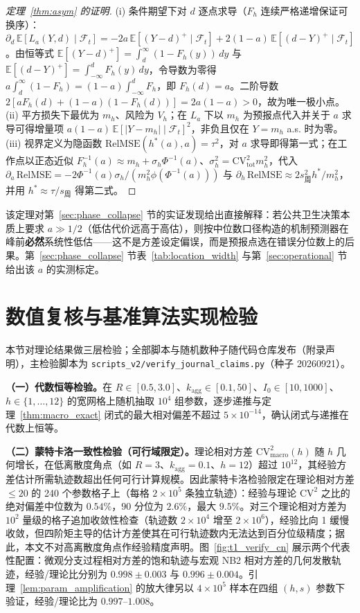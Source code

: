 \documentclass[10pt,UTF8,a4paper,zihao=-4]{ctexart}
\theoremstyle{plain}
\theoremstyle{definition}
\theoremstyle{remark}
\begin{document}
\begin{proof}[定理~\ref{thm:asym} 的证明]
(i) 条件期望下对 $d$ 逐点求导（$F_h$ 连续严格递增保证可换序）：$\partial_d\,\mathbb{E}[L_a(Y,d)\mid\mathcal{F}_t] = -2a\,\mathbb{E}[(Y-d)^+\mid\mathcal{F}_t] + 2(1-a)\,\mathbb{E}[(d-Y)^+\mid\mathcal{F}_t]$。由恒等式 $\mathbb{E}[(Y-d)^+] = \int_d^\infty (1-F_h(y))\,dy$ 与 $\mathbb{E}[(d-Y)^+] = \int_{-\infty}^d F_h(y)\,dy$，令导数为零得 $a\int_d^\infty (1-F_h) = (1-a)\int_{-\infty}^d F_h$，即 $F_h(d) = a$。二阶导数 $2[aF_h(d) + (1-a)(1-F_h(d))] = 2a(1-a) > 0$，故为唯一极小点。
(ii) 平方损失下最优为 $m_h$、风险为 $V_h$；在 $L_a$ 下以 $m_h$ 为预报点代入并关于 $a$ 求导可得增量项 $a(1-a)\,\mathbb{E}[|Y-m_h|\mid\mathcal{F}_t]^2$，非负且仅在 $Y=m_h$ a.s. 时为零。
(iii) 视界定义为隐函数 $\text{RelMSE}(h^*(a),a)=\tau^2$，对 $a$ 求导即得第一式；在工作点以正态近似 $F_h^{-1}(a) \approx m_h + \sigma_h\Phi^{-1}(a)$、$\sigma_h^2 = \text{CV}^2_{\text{tot}} m_h^2$，代入 $\partial_a\,\text{RelMSE} = -2\Phi^{-1}(a)\sigma_h/(m_h^2\phi(\Phi^{-1}(a)))$ 与 $\partial_h\,\text{RelMSE} \approx 2 s_{\text{周}}^2 h^*/m_h^2$，并用 $h^*\approx\tau/s_{\text{周}}$ 得第二式。
\end{proof}

该定理对第~\ref{sec:phase_collapse} 节的实证发现给出直接解释：若公共卫生决策本质上要求 $a \gg 1/2$（低估代价远高于高估），则按中位数口径构造的机制预测器在峰前\textbf{必然}系统性低估——这不是方差设定偏误，而是预报点选在错误分位数上的后果。第~\ref{sec:phase_collapse} 节表~\ref{tab:location_width} 与第~\ref{sec:operational} 节给出该 $a$ 的实测标定。


\section{数值复核与基准算法实现检验}\label{sec:simulation}

本节对理论结果做三层检验；全部脚本与随机数种子随代码仓库发布（附录声明），主检验脚本为 \texttt{scripts\_v2/verify\_journal\_claims.py}（种子 20260921）。

\textbf{（一）代数恒等检验。}在 $R \in [0.5, 3.0]$、$k_{\text{agg}} \in [0.1, 50]$、$I_0 \in [10, 1000]$、$h \in \{1,\dots,12\}$ 的宽网格上随机抽取 $10^4$ 组参数，逐步递推与定理~\ref{thm:macro_exact} 闭式的最大相对偏差不超过 $5 \times 10^{-14}$，确认闭式与递推在代数上恒等。

\textbf{（二）蒙特卡洛一致性检验（可行域限定）。}理论相对方差 $\text{CV}^2_{\text{macro}}(h)$ 随 $h$ 几何增长，在低离散度角点（如 $R=3$、$k_{\text{agg}}=0.1$、$h=12$）超过 $10^{12}$，其经验方差估计所需轨迹数超出任何可行计算规模。因此蒙特卡洛检验限定在理论相对方差 $\le 20$ 的 240 个参数格子上（每格 $2 \times 10^5$ 条独立轨迹）：经验与理论 $\text{CV}^2$ 之比的绝对偏差中位数为 $0.54\%$，$90$ 分位为 $2.6\%$，最大 $9.5\%$。对三个理论相对方差为 $10^2$ 量级的格子追加收敛性检查（轨迹数 $2 \times 10^4$ 增至 $2 \times 10^6$），经验比向 1 缓慢收敛，但四阶矩主导的估计方差使其在可行轨迹数内无法达到百分位级精度；据此，本文不对高离散度角点作经验精度声明。图~\ref{fig:t1_verify_cn} 展示两个代表性配置：微观分支过程相对方差的饱和轨迹与宏观 NB2 相对方差的几何发散轨迹，经验/理论比分别为 $0.998 \pm 0.003$ 与 $0.996 \pm 0.004$。引理~\ref{lem:param_amplification} 的放大律另以 $4 \times 10^5$ 样本在四组 $(h, s)$ 参数下验证，经验/理论比为 $0.997$--$1.008$。
\end{document}
